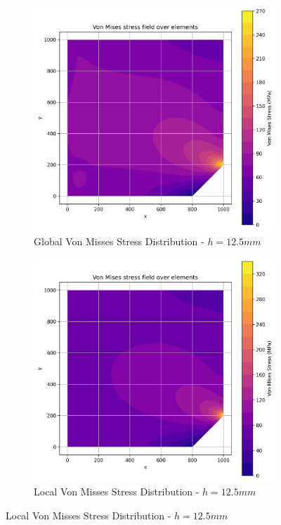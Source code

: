 \begin{figure}[H]
  \centering
  \begin{subfigure}[b]{0.45\textwidth}
    \centering
    \includegraphics[width=\textwidth]{GRAFICOS/Quad9/1.5mm_global/resultados_von_mises.png}
    \caption{Global Von Misses Stress Distribution - $h=12.5mm$}
    \label{fig:img12}
  \end{subfigure}
  \hfill
  \begin{subfigure}[b]{0.45\textwidth}
    \centering
    \includegraphics[width=\textwidth]{GRAFICOS/Quad9/1.5mm_local/resultados_von_mises.png}
    \caption{Local Von Misses Stress Distribution - $h=12.5mm$}
    \label{fig:img22}
  \end{subfigure}
\end{figure}

